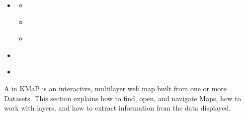 \documentclass[letterpaper,10pt,english]{sphinxmanual}
\begin{document}
\begin{sphinxcontents}
\begin{itemize}
\begin{itemize}
\item {} 
\sphinxAtStartPar
{}\label{\detokenize{en/04_exploring_maps:id18}}{\hyperref[\detokenize{en/04_exploring_maps:area-measurement}]{}}

\end{itemize}

\item {} 
\sphinxAtStartPar
{}\label{\detokenize{en/04_exploring_maps:id19}}{\hyperref[\detokenize{en/04_exploring_maps:printing-and-exporting-the-map-view}]{}}
\begin{itemize}
\item {} 
\sphinxAtStartPar
{}\label{\detokenize{en/04_exploring_maps:id20}}{\hyperref[\detokenize{en/04_exploring_maps:print}]{}}

\item {} 
\sphinxAtStartPar
{}\label{\detokenize{en/04_exploring_maps:id21}}{\hyperref[\detokenize{en/04_exploring_maps:share-permalink}]{}}

\item {} 
\sphinxAtStartPar
{}\label{\detokenize{en/04_exploring_maps:id22}}{\hyperref[\detokenize{en/04_exploring_maps:embed}]{}}

\end{itemize}

\item {} 
\sphinxAtStartPar
{}\label{\detokenize{en/04_exploring_maps:id23}}{\hyperref[\detokenize{en/04_exploring_maps:saving-changes-to-a-map}]{}}

\item {} 
\sphinxAtStartPar
{}\label{\detokenize{en/04_exploring_maps:id24}}{\hyperref[\detokenize{en/04_exploring_maps:creating-a-new-map}]{}}

\end{itemize}
\end{sphinxcontents}

\sphinxAtStartPar
A  in KMaP is an interactive, multi\sphinxhyphen{}layer web map built from one or more Datasets.
This section explains how to find, open, and navigate Maps, how to work with layers, and
how to extract information from the data displayed.
\end{document}
